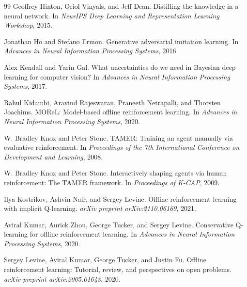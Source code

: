 \documentclass{article}
\begin{document}
\begin{thebibliography}{99}
Geoffrey Hinton, Oriol Vinyals, and Jeff Dean.
\newblock Distilling the knowledge in a neural network.
\newblock In \emph{NeurIPS Deep Learning and Representation Learning Workshop}, 2015.

Jonathan Ho and Stefano Ermon.
\newblock Generative adversarial imitation learning.
\newblock In \emph{Advances in Neural Information Processing Systems}, 2016.

Alex Kendall and Yarin Gal.
\newblock What uncertainties do we need in Bayesian deep learning for computer vision?
\newblock In \emph{Advances in Neural Information Processing Systems}, 2017.

Rahul Kidambi, Aravind Rajeswaran, Praneeth Netrapalli, and Thorsten Joachims.
\newblock MOReL: Model-based offline reinforcement learning.
\newblock In \emph{Advances in Neural Information Processing Systems}, 2020.

W. Bradley Knox and Peter Stone.
\newblock TAMER: Training an agent manually via evaluative reinforcement.
\newblock In \emph{Proceedings of the 7th International Conference on Development and Learning}, 2008.

W. Bradley Knox and Peter Stone.
\newblock Interactively shaping agents via human reinforcement: The TAMER framework.
\newblock In \emph{Proceedings of K-CAP}, 2009.

Ilya Kostrikov, Ashvin Nair, and Sergey Levine.
\newblock Offline reinforcement learning with implicit Q-learning.
\newblock \emph{arXiv preprint arXiv:2110.06169}, 2021.

Aviral Kumar, Aurick Zhou, George Tucker, and Sergey Levine.
\newblock Conservative Q-learning for offline reinforcement learning.
\newblock In \emph{Advances in Neural Information Processing Systems}, 2020.

Sergey Levine, Aviral Kumar, George Tucker, and Justin Fu.
\newblock Offline reinforcement learning: Tutorial, review, and perspectives on open problems.
\newblock \emph{arXiv preprint arXiv:2005.01643}, 2020.


\end{thebibliography}
\end{document}
